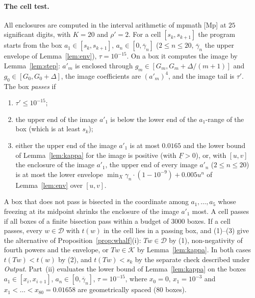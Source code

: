 \documentclass[11pt,a4paper]{article}
\theoremstyle{definition}
\theoremstyle{remark}
\newcommand{\cD}{\mathcal{D}}
\newcommand{\cK}{\mathcal{K}}
\begin{document}
\paragraph{The cell test.}
All enclosures are computed in the interval arithmetic of mpmath [Mp] at $25$ significant digits, with $K=20$ and $\rho'=2$.
For a cell $[s_k,s_{k+1}]$ the program starts from the box $a_1\in[s_k,s_{k+1}]$, $a_n\in[0,\overline\gamma_n]$ ($2\le n\le20$, $\overline\gamma_n$ the upper envelope of Lemma~\ref{lem:env}), $\tau=10^{-15}$.
On a box it computes the image by Lemma~\ref{lem:step}: $a'_m$ is enclosed through $g_m\in[G_m,G_m+\Delta/(m+1)]$ and $g_0\in[G_0,G_0+\Delta]$, the image coefficients are $(a'_m)^4$, and the image tail is $\tau'$.
The box \emph{passes} if
\begin{enumerate}[label=(\arabic*),nosep]
\item $\tau'\le10^{-15}$;
\item the upper end of the image $a'_1$ is below the lower end of the $a_1$-range of the box (which is at least $s_k$);
\item either the upper end of the image $a'_1$ is at most $0.0165$ and the lower bound of Lemma~\ref{lem:kappa} for the image is positive (with $\underline F>0$), or, with $[u,v]$ the enclosure of the image $a'_1$, the upper end of every image $a'_n$ ($2\le n\le20$) is at most the lower envelope $\min_X\gamma_n\cdot(1-10^{-9})+0.005u^n$ of Lemma~\ref{lem:env} over $[u,v]$.
\end{enumerate}
A box that does not pass is bisected in the coordinate among $a_1,\dots,a_5$ whose freezing at its midpoint shrinks the enclosure of the image $a'_1$ most.
A cell passes if all boxes of a finite bisection pass within a budget of $3000$ boxes.
If a cell passes, every $w\in\cD$ with $t(w)$ in the cell lies in a passing box, and (1)--(3) give the alternative of Proposition~\ref{prop:whalf}(i): $Tw\in\cD$ by (1), non-negativity of fourth powers and the envelope, or $Tw\in\cK$ by Lemma~\ref{lem:kappa}.
In both cases $t(Tw)<t(w)$ by (2), and $t(Tw)<s_k$ by the separate check described under \emph{Output}.
Part~(ii) evaluates the lower bound of Lemma~\ref{lem:kappa} on the boxes $a_1\in[x_i,x_{i+1}]$, $a_n\in[0,\overline\gamma_n]$, $\tau=10^{-15}$, where $x_0=0$, $x_1=10^{-3}$ and $x_1<\dots<x_{80}=0.01658$ are geometrically spaced ($80$ boxes).
\end{document}

